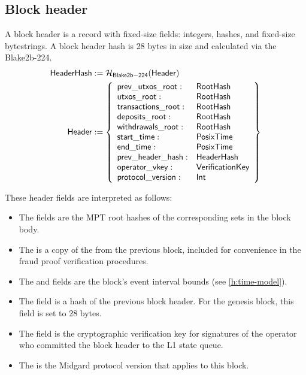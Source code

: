 \documentclass[../midgard.tex]{subfiles}
\begin{document}
\subsection{Block header}
\label{h:block-header}

A block header is a record with fixed-size fields: integers, hashes, and fixed-size bytestrings.
A block header hash is 28 bytes in size and calculated via the Blake2b-224.
\begin{equation*}
\begin{split}
  \mathsf{HeaderHash} &:= \mathcal{H}_{\mathsf{Blake2b-224}}(\mathsf{Header}) \\
  \mathsf{Header} &:= \left\{
    \begin{array}{ll}
        \mathsf{prev\_utxos\_root} : & \mathsf{RootHash} \\
        \mathsf{utxos\_root} : & \mathsf{RootHash} \\
        \mathsf{transactions\_root} : & \mathsf{RootHash} \\
        \mathsf{deposits\_root} : & \mathsf{RootHash} \\
        \mathsf{withdrawals\_root} : & \mathsf{RootHash} \\
        \mathsf{start\_time} : & \mathsf{PosixTime} \\
        \mathsf{end\_time} : & \mathsf{PosixTime} \\
        \mathsf{prev\_header\_hash} : & \mathsf{HeaderHash} \\
        \mathsf{operator\_vkey} : & \mathsf{VerificationKey} \\
        \mathsf{protocol\_version} : & \mathsf{Int} \\
    \end{array} \right\}
\end{split}
\end{equation*}

These header fields are interpreted as follows:
\begin{itemize}
    \item The  fields are the MPT root hashes of the corresponding sets in the block body.
    \item The  is a copy of the  from the previous block, included for convenience in the fraud proof verification procedures.
    \item The  and  fields are the block's event interval bounds (see \cref{h:time-model}).
    \item The  field is a hash of the previous block header. For the genesis block, this field is set to 28  bytes.
    \item The  field is the cryptographic verification key for signatures of the operator who committed the block header to the L1 state queue.
    \item The  is the Midgard protocol version that applies to this block.
\end{itemize}
\end{document}
